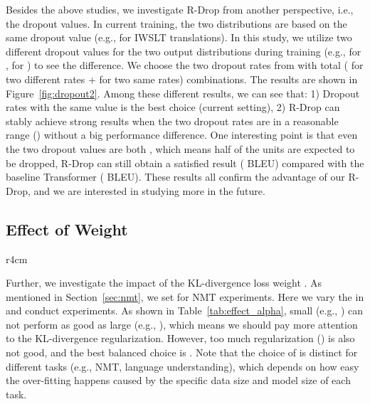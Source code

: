 \documentclass{article}
\begin{document}
Besides the above studies, we investigate R-Drop from another perspective, i.e., the dropout values. In current training, the two distributions are based on the same dropout value (e.g.,  for IWSLT translations). In this study, we utilize two different dropout values for the two output distributions during training (e.g.,  for ,  for ) to see the difference. We choose the two dropout rates from  with total  ( for two different rates +  for two same rates) combinations. The results are shown in Figure~\ref{fig:dropout2}. Among these different results, we can see that: 1) Dropout rates with the same value  is the best choice (current setting), 2) R-Drop can stably achieve strong results when the two dropout rates are in a reasonable range () without a big performance difference. One interesting point is that even the two dropout values are both , which means half of the units are expected to be dropped, R-Drop can still obtain a satisfied result ( BLEU) compared with the baseline Transformer ( BLEU). These results all confirm the advantage of our R-Drop, and we are interested in studying more in the future. 



\subsection{Effect of Weight }

\begin{wraptable}{r}{4cm}
\vspace{-0.5cm}
\centering
{}
\caption{
BLEU scores with different .
}
\label{tab:effect_alpha}
\vspace{-0.3cm}
\end{wraptable}


Further, we investigate the impact of the KL-divergence loss weight . As mentioned in Section~\ref{sec:nmt}, we set  for NMT experiments. Here we vary the  in  and conduct experiments. As shown in Table~\ref{tab:effect_alpha}, small  (e.g., ) can not perform as good as large  (e.g., ), which means we should pay more attention to the KL-divergence regularization. However, too much regularization () is also not good, and the best balanced choice is . Note that the choice of  is distinct for different tasks (e.g., NMT, language understanding), which depends on how easy the over-fitting happens caused by the specific data size and model size of each task. 
\end{document}

